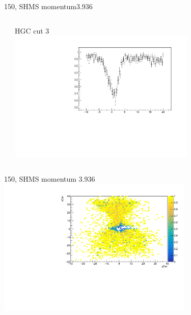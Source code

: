 \documentclass[aspectratio=169,xcolor=dvipsnames]{beamer}
\begin{document}
\begin{frame}{150, SHMS momentum3.936}
\begin{columns}
\begin{column}[T]{0.5\textwidth}
\end{column}
\begin{column}[T]{0.5\textwidth}
HGC cut 3 \\
\includegraphics[width = 0.7\textwidth]{results/pid/SHMS_hgcer_eff_6194_3.pdf}
\end{column}
\end{columns}
\end{frame}
\begin{frame}{150, SHMS momentum 3.936}
\includegraphics[width = 0.7\textwidth]{results/pid/SHMS_hgcer_eff_6194_2_2d.pdf}
\end{frame}
\end{document}
